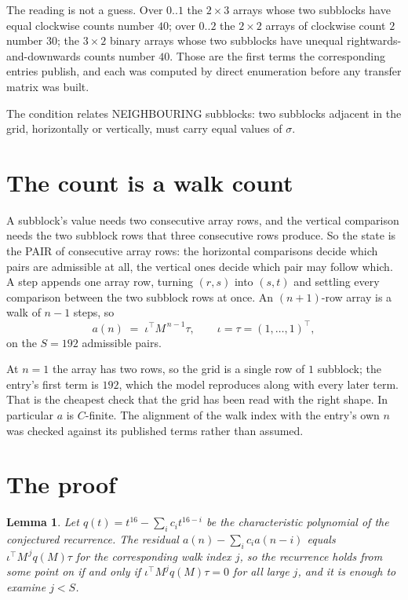 \documentclass[11pt,a4paper]{article}
\theoremstyle{plain}
\newtheorem{lemma}[theorem]{Lemma}
\theoremstyle{definition}
\begin{document}
The reading is not a guess. Over $0..1$ the $2\times3$ arrays whose two subblocks have equal
clockwise counts number $40$; over $0..2$ the $2\times2$ arrays of clockwise count $2$ number
$30$; the $3\times2$ binary arrays whose two subblocks have unequal rightwards-and-downwards
counts number $40$. Those are the first terms the corresponding entries publish, and each was
computed by direct enumeration before any transfer matrix was built.

The condition relates NEIGHBOURING subblocks: two subblocks adjacent in the grid, horizontally
or vertically, must carry equal values of $\sigma$.

\section{The count is a walk count}

A subblock's value needs two consecutive array rows, and the vertical
comparison needs the two subblock rows that three consecutive rows produce. So the state is the
PAIR of consecutive array rows: the horizontal comparisons decide which pairs are admissible at
all, the vertical ones decide which pair may follow which. A step appends one array row,
turning $(r,s)$ into $(s,t)$ and settling every comparison between the two subblock rows at
once. An $(n+1)$-row array is a walk of $n-1$ steps, so
\[
a(n)\;=\;\iota^{\!\top}M^{\,n-1}\tau,\qquad\iota=\tau=(1,\dots,1)^{\!\top},
\]
on the $S=192$ admissible pairs.

At $n=1$ the array has two rows, so the grid is a single row of $1$
subblock; the entry's first term is $192$, which the model
reproduces along with every later term. That is the cheapest check that the grid has been read
with the right shape.
In particular $a$ is $C$-finite. The alignment of the walk index with the entry's own $n$ was
checked against its published terms rather than assumed.

\section{The proof}

\begin{lemma}\label{lem:crit}
Let $q(t)=t^{16}-\sum_i c_it^{16-i}$ be the characteristic polynomial of the
conjectured recurrence. The residual $a(n)-\sum_ic_ia(n-i)$ equals
$\iota^{\!\top}M^{\,j}q(M)\tau$ for the corresponding walk index $j$, so the recurrence
holds from some point on if and only if $\iota^{\!\top}M^{j}q(M)\tau=0$ for all large $j$,
and it is enough to examine $j<S$.
\end{lemma}
\end{document}
